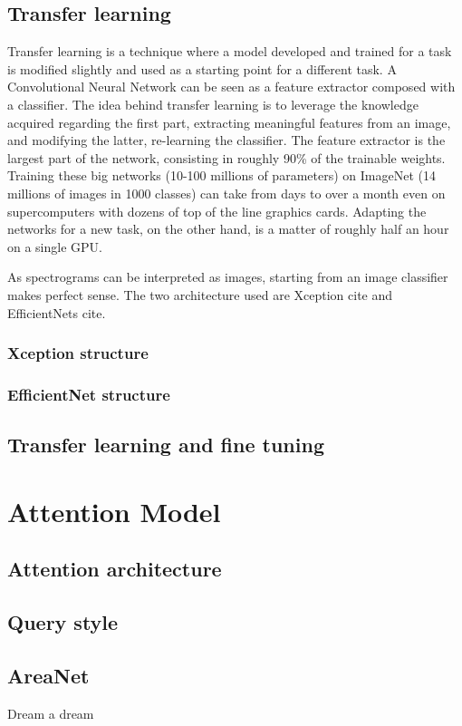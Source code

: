 \subsection{Transfer learning}

Transfer learning is a technique where a model developed and trained for a task
is modified slightly and used as a starting point for a different task.
A Convolutional Neural Network can be seen as a feature extractor composed with
a classifier.
The idea behind transfer learning is to leverage the knowledge acquired
regarding the first part, extracting meaningful features from an image, and
modifying the latter, re-learning the classifier.
The feature extractor is the largest part of the network, consisting in roughly
90\% of the trainable weights.
Training these big networks (10-100 millions of parameters) on ImageNet (14
millions of images in 1000 classes) can take from days to over a month even on
supercomputers with dozens of top of the line graphics cards.
Adapting the networks for a new task, on the other hand, is a matter of roughly
half an hour on a single GPU.


As spectrograms can be interpreted as images, starting from an image classifier
makes perfect sense. The two architecture used are Xception 
cite
and EfficientNets
cite.

\subsubsection{Xception structure}

\subsubsection{EfficientNet structure}

\subsection{Transfer learning and fine tuning}

\section{Attention Model}
\label{sec:attention_model}

\subsection{Attention architecture}

\subsection{Query style}

\subsection{AreaNet}

Dream a dream

